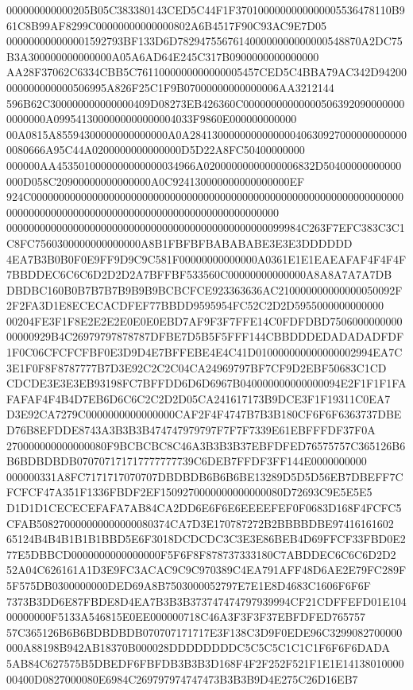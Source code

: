 \documentclass[UTF8,fontset=fandol,zihao=-4,a4paper]{ctexart}
\begin{document}
{{000000000000205B05C383380143CED5C44F1F3701000000000000005536478110B961C8B99AF8299C00000000000000802A6B4517F90C93AC9E7D05
000000000000001592793BF133D6D782947556761400000000000000548870A2DC75B3A300000000000000A05A6AD64E245C317B0900000000000000
AA28F37062C6334CBB5C7611000000000000005457CED5C4BBA79AC342D94200000000000000506995A826F25C1F9B07000000000000006AA3212144
596B62C300000000000000409D08273EB426360C000000000000005063920900000000000000A0995413000000000000004033F9860E000000000000
00A0815A85594300000000000000A0A2841300000000000000406309270000000000000080666A95C44A0200000000000000D5D22A8FC50400000000
000000AA4535010000000000000034966A02000000000000006832D50400000000000000D058C20900000000000000A0C924130000000000000000EF
924C00000000000000000000000000000000000000000000000000000000000000000000000000000000000000000000000000000000000000000000
00000000000000000000000000000000000000000000000099984C263F7EFC383C3C1C8FC7560300000000000000A8B1FBFBFBABABABE3E3E3DDDDDD
4EA7B3B0B0F0E9FF9D9C9C581F00000000000000A0361E1E1EAEAFAF4F4F4F7BBDDEC6C6C6D2D2D2A7BFFBF533560C00000000000000A8A8A7A7A7DB
DBDBC160B0B7B7B7B9B9B9BCBCFCE923363636AC210000000000000050092F2F2FA3D1E8ECECACDFEF77BBDD9595954FC52C2D2D5955000000000000
00204FE3F1F8E2E2E2E0E0E0EBD7AF9F3F7FFE14C0FDFDBD750600000000000000929B4C26979797878787DFBE7D5B5F5FFF144CBBDDDEDADADADFDF
1F0C06CFCFCFBF0E3D9D4E7BFFEBE4E4C41D010000000000000002994EA7C3E1F0F8F8787777B7D3E92C2C2C04CA24969797BF7CF9D2EBF50683C1CD
CDCDE3E3E3EB93198FC7BFFDD6D6D6967B040000000000000094E2F1F1F1FAFAFAF4F4B4D7EB6D6C6C2C2D2D05CA241617173B9DCE3F1F19311C0EA7
D3E92CA7279C0000000000000000CAF2F4F4747B7B3B180CF6F6F6363737DBED76B8EFDDE8743A3B3B3B474747979797F7F7F7339E61EBFFFDF37F0A
270000000000000080F9BCBCBC8C46A3B3B3B37EBFDFED76575757C365126B6B6BDBDBDB070707171717777777739C6DEB7FFDF3FF144E0000000000
000000331A8FC7171717070707DBDBDB6B6B6BE13289D5D5D56EB7DBEFF7CFCFCF47A351F1336FBDF2EF1509270000000000000080D72693C9E5E5E5
D1D1D1CECECEFAFA7AB84CA2DD6E6F6E6EEEEFEF0F0683D168F4FCFC5CFAB508270000000000000080374CA7D3E170787272B2BBBBDBE97416161602
65124B4B4B1B1B1BBD5E6F3018DCDCDC3C3E3E86BEB4D69FFCF33FBD0E277E5DBBCD0000000000000000F5F6F8F878737333180C7ABDDEC6C6C6D2D2
52A04C626161A1D3E9FC3ACAC9C9C970389C4EA791AFF48D6AE2E79FC289F5F575DB0300000000DED69A8B7503000052797E7E1E8D4683C1606F6F6F
7373B3DD6E87FBDE8D4EA7B3B3B373747474797939994CF21CDFFEFD01E10400000000F5133A546815E0EE000000718C46A3F3F3F37EBFDFED765757
57C365126B6B6BDBDBDB070707171717E3F138C3D9F0EDE96C3299082700000000A88198B942AB18370B000028DDDDDDDDC5C5C5C1C1C1F6F6F6DADA
5AB84C627575B5DBEDF6FBFDB3B3B3D168F4F2F252F521F1E1E1413801000000400D0827000080E6984C269797974747473B3B3B9D4E275C26D16EB7
}}
\end{document}
